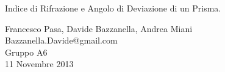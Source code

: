 \begin{center}

     	{\LARGE Indice di Rifrazione e Angolo di Deviazione di un Prisma.}
	\vspace{0.5cm}

      	{\large Francesco Pasa, Davide Bazzanella, Andrea Miani} \\
      	{Bazzanella.Davide@gmail.com} \\
		{\large Gruppo A6} \\
	
	\vspace{0.3cm}
      	{\large 11 Novembre 2013}

\end{center}
